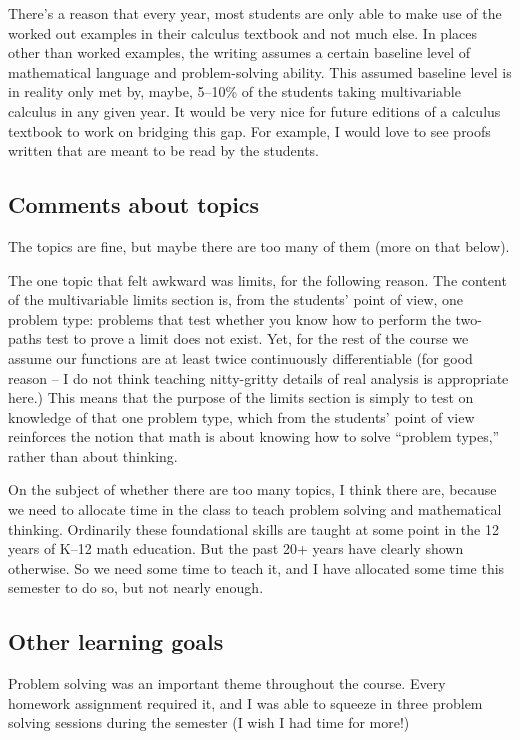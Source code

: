 \documentclass[11pt,oneside]{amsart}
\begin{document}
There's a reason that every year, most students are only able to make use of the worked out examples in their calculus textbook and not much else. In places other than worked examples, the writing assumes a certain baseline level of mathematical language and problem-solving ability. This assumed baseline level is in reality only met by, maybe, 5--10\% of the students taking multivariable calculus in any given year. It would be very nice for future editions of a calculus textbook to work on bridging this gap. For example, I would love to see proofs written that are meant to be read by the students.

\subsection{Comments about topics}
The topics are fine, but maybe there are too many of them (more on that below).

The one topic that felt awkward was limits, for the following reason. The content of the multivariable limits section is, from the students' point of view, one problem type: problems that test whether you know how to perform the two-paths test to prove a limit does not exist. Yet, for the rest of the course we assume our functions are at least twice continuously differentiable (for good reason -- I do not think teaching nitty-gritty details of real analysis is appropriate here.) This means that the purpose of the limits section is simply to test on knowledge of that one problem type, which from the students' point of view reinforces the notion that math is about knowing how to solve ``problem types,'' rather than about thinking.

On the subject of whether there are too many topics, I think there are, because we need to allocate time in the class to teach problem solving and mathematical thinking. Ordinarily these foundational skills are taught at some point in the 12 years of K--12 math education. But the past 20+ years have clearly shown otherwise. So we need some time to teach it, and I have allocated some time this semester to do so, but not nearly enough.

\subsection{Other learning goals}
Problem solving was an important theme throughout the course. Every homework assignment required it, and I was able to squeeze in three problem solving sessions during the semester (I wish I had time for more!)
\end{document}
